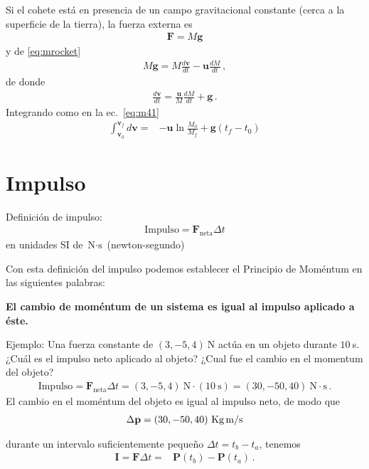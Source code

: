 Si el cohete está en presencia de un campo gravitacional constante
(cerca a la superficie de la tierra), la fuerza externa es
\begin{align}
  \mathbf{F}=M\mathbf{g}
\end{align}
y de \eqref{eq:mrocket}
\begin{align}
     M\mathbf{g}=M\frac{d\mathbf{v}}{dt}-\mathbf{u}\frac{dM}{dt}\,,
\end{align}
de donde
\begin{align}
  \frac{d\mathbf{v}}{dt}=\frac{\mathbf{u}}{M}\frac{dM}{dt}+\mathbf{g}\,.
\end{align}
Integrando como en la ec.~\eqref{eq:m41}
\begin{align}
   \int_{\mathbf{v}_0}^{\mathbf{v}_f}{d\mathbf{v}}=&
   -\mathbf{u}\ln\frac{M_0}{M_f}+\mathbf{g}(t_f-t_0)
\end{align}






\section{Impulso}
\begin{frame}
{Definición de impulso:}
\begin{align}
  \text{Impulso}=\mathbf{F}_{\text{neta}}\Delta t
\end{align}
en unidades SI de $\text{N}\cdot\text{s}$ (newton-segundo)
\end{frame}

Con esta definición del impulso podemos establecer el Principio de Moméntum en las siguientes palabras:
\begin{frame}
  \begin{center}
    \textbf{El cambio de moméntum de un sistema es igual al impulso aplicado a éste.}
  \end{center}
\end{frame}

\begin{frame}
  Ejemplo: Una fuerza constante de $(3,-5,4)\ $N actúa en un objeto durante $10\ $s. ¿Cuál es el impulso neto aplicado al objeto? ¿Cual fue el cambio en el momentum del objeto?
\begin{align}
\text{Impulso}=\mathbf{F}_{\text{neta}}\Delta t=(3,-5,4)\ \text{N}\cdot (10\ \text{s})=
(30,-50,40)\ \text{N}\cdot\text{s}\,.
\end{align}
El cambio en el moméntum del objeto es igual al impulso neto, de modo que
\begin{align}
  \Delta \mathbf{p}=(30,-50,40)\ \text{Kg\,m/s}
\end{align}
\end{frame}
durante un intervalo suficientemente pequeño $\Delta t=t_b-t_a$, tenemos
\begin{align}
   \mathbf{I}=\mathbf{F}\Delta t=&\mathbf{P}(t_b)-\mathbf{P}(t_a)\,.
\end{align}

